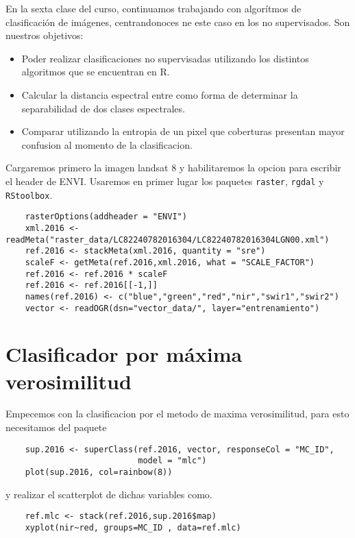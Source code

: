 En la sexta clase del curso, continuamos trabajando con algor\'itmos de clasificaci\'on
de im\'agenes, centrandonoces ne este caso en los no supervisados. Son nuestros objetivos:

\begin{itemize}
  \item Poder realizar clasificaciones no supervisadas utilizando los distintos
  algoritmos que se encuentran en R.
  \item Calcular la distancia espectral entre como forma de determinar la separabilidad
  de dos clases espectrales.
  \item Comparar utilizando la entropia de un pixel que coberturas presentan
  mayor confusion al momento de la clasificacion.
\end{itemize}

Cargaremos primero la imagen landsat 8 y habilitaremos la opcion para escribir
el header de ENVI\@. Usaremos en primer lugar los paquetes \texttt{raster},
\texttt{rgdal} y \texttt{RStoolbox}.

\begin{lstlisting}
    rasterOptions(addheader = "ENVI")
    xml.2016 <- readMeta("raster_data/LC82240782016304/LC82240782016304LGN00.xml")
    ref.2016 <- stackMeta(xml.2016, quantity = "sre")
    scaleF <- getMeta(ref.2016,xml.2016, what = "SCALE_FACTOR")
    ref.2016 <- ref.2016 * scaleF
    ref.2016 <- ref.2016[[-1,]]
    names(ref.2016) <- c("blue","green","red","nir","swir1","swir2")
    vector <- readOGR(dsn="vector_data/", layer="entrenamiento")
\end{lstlisting}

\section{Clasificador por m\'axima verosimilitud}

Empecemos con la clasificacion por el metodo de maxima verosimilitud, para esto
necesitamos del paquete

\begin{lstlisting}
    sup.2016 <- superClass(ref.2016, vector, responseCol = "MC_ID",
                           model = "mlc")
    plot(sup.2016, col=rainbow(8))
\end{lstlisting}

y realizar el scatterplot de dichas variables como.

\begin{lstlisting}
    ref.mlc <- stack(ref.2016,sup.2016$map)
    xyplot(nir~red, groups=MC_ID , data=ref.mlc)
\end{lstlisting}

